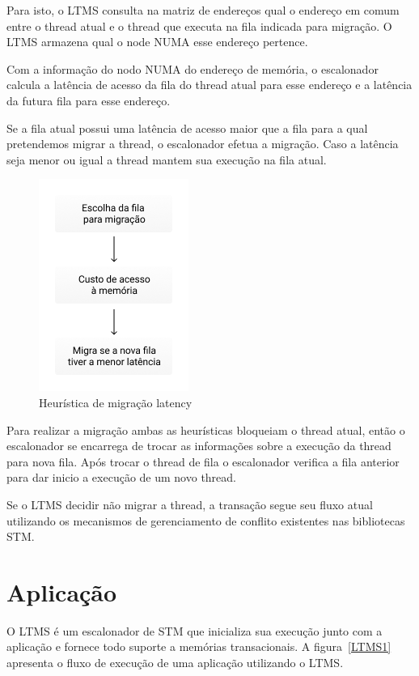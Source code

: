 \documentclass[diss,capa]{texufpel}
\begin{document}
Para isto, o LTMS consulta na matriz de endereços qual o endereço em comum entre o thread atual e o thread que executa na fila indicada para migração. O LTMS armazena qual o node NUMA esse endereço pertence.

Com a informação do nodo NUMA do endereço de memória, o escalonador calcula a latência de acesso da fila do thread atual para esse endereço e a latência da futura fila para esse endereço.

Se a fila atual possui uma latência de acesso maior que a fila para a qual pretendemos migrar a thread, o escalonador efetua a migração. Caso a latência seja menor ou igual a thread mantem sua execução na fila atual.

\begin{figure}[htbp]
  \centering
  \includegraphics[scale=.8]{images/latency.png}
  \caption{Heurística de migração latency}
\label{latency}
\end{figure}

Para realizar a migração ambas as heurísticas bloqueiam o thread atual, então o escalonador se encarrega de trocar as informações sobre a execução da thread para nova fila. Após trocar o thread de fila o escalonador verifica a fila anterior para dar inicio a execução de um novo thread.

Se o LTMS decidir não migrar a thread, a transação segue seu fluxo atual utilizando os mecanismos de gerenciamento de conflito existentes nas bibliotecas STM.

\section{\textbf{Aplicação}}

O LTMS é um escalonador de STM que inicializa sua execução junto com a aplicação e fornece todo suporte a memórias transacionais. A figura~\ref{LTMS1} apresenta o fluxo de execução de uma aplicação utilizando o LTMS.
\end{document}
